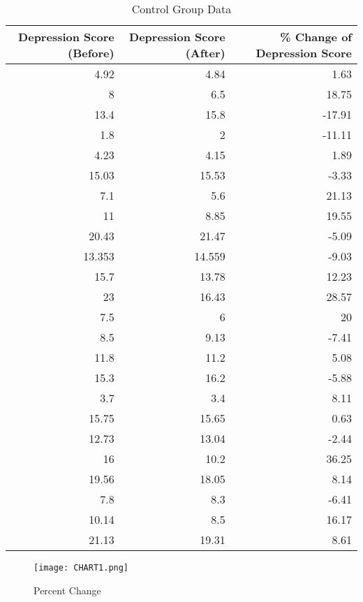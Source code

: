 \documentclass[12pt, titlepage]{article}
\begin{document}
  \begin{table}[h!]
    \small
    \caption{Control Group Data}
    \label{tab:2}
  \centering
  \begin{tabular}{rrr}
      \toprule
  Depression Score (Before) & Depression Score (After) & \% Change of Depression Score \\ 
    \midrule
     4.92 & 4.84 & 1.63\\ 
     8 & 6.5 & 18.75\\ 
     13.4 & 15.8 & -17.91\\ 
     1.8 & 2 & -11.11\\ 
     4.23 & 4.15 & 1.89\\ 
     15.03 & 15.53 & -3.33\\  
     7.1 & 5.6 & 21.13\\
     11 & 8.85 & 19.55\\
     20.43 & 21.47 & -5.09\\
     13.353 & 14.559 & -9.03\\
     15.7 & 13.78 & 12.23\\
     23 & 16.43 & 28.57\\
     7.5 & 6 & 20\\
     8.5 & 9.13 & -7.41\\
     11.8 & 11.2 & 5.08\\
     15.3 & 16.2 & -5.88\\
     3.7 & 3.4 & 8.11\\
     15.75 & 15.65 & 0.63\\
     12.73 & 13.04 & -2.44\\
     16 & 10.2 & 36.25\\
     19.56 & 18.05 & 8.14\\
     7.8 & 8.3 & -6.41\\
     10.14 & 8.5 & 16.17\\
     21.13 & 19.31 & 8.61\\
     \bottomrule
  \end{tabular}
  \end{table}

  \newpage

  \begin{figure}[h!]
    \centering
    \texttt{[image: CHART1.png]}
    \label{fig:chart1}
    \caption{Percent Change}
  \end{figure}
\end{document}
